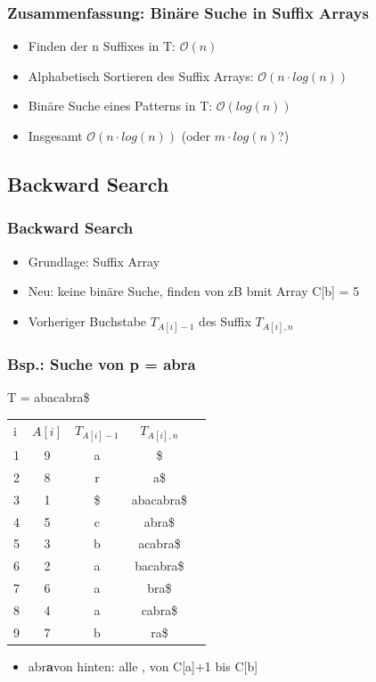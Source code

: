 \documentclass{beamer}
\begin{document}
\begin{frame}
\frametitle{Zusammenfassung: Binäre Suche in Suffix Arrays}
\begin{itemize}
\item Finden der n Suffixes in T: $\mathcal{O}(n)$
\item Alphabetisch Sortieren des Suffix Arrays: $\mathcal{O}(n\cdot log (n))$
\item Binäre Suche eines Patterns in T: $\mathcal{O}(log (n))$
\item Insgesamt $\mathcal{O}(n \cdot log (n))$ (oder $m \cdot log (n)$?)
\end{itemize}
\end{frame}
\subsection{Backward Search}
\begin{frame}
\frametitle{Backward Search}
\begin{itemize}
\item Grundlage: Suffix Array
\item Neu: keine binäre Suche, finden von zB \glqq b\grqq mit Array C[\glqq b\grqq ] = 5
\item Vorheriger Buchstabe $T_{A[i]-1}$ des Suffix $T_{A[i],n}$
\end{itemize}
\end{frame}
\begin{frame}
\frametitle{Bsp.: Suche von p = abra}
T = abacabra\$ \newline
\begin{tabular}{l c cc r}
i & $A[i]$ & $T_{A[i]-1}$ & $T_{A[i],n}$\\
1 & 9 & a & \$ \\
2 & 8 & r & a\$ \\
3 & 1 & \$ & abacabra\$ \\
4 & 5 & c & abra\$ \\
5 & 3 & b & acabra\$ \\
6 & 2 & a & bacabra\$ \\
7 & 6 & a & bra\$ \\
8 & 4 & a & cabra\$ \\
9 & 7 & b & ra\$ \\
\end{tabular}
\begin{itemize}
\item \glqq abr\color{red}\textbf{a}\color{black}\grqq von hinten: alle , von C[\glqq a\grqq]+1 bis C[\glqq b\grqq]
\end{itemize}
\end{frame}
\end{document}
